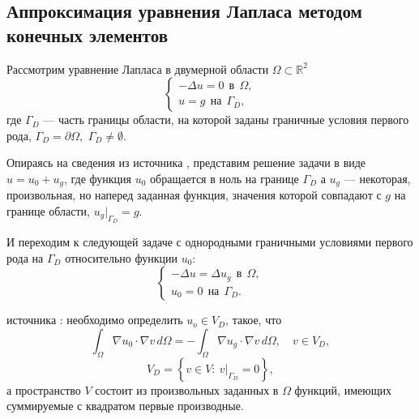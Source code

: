 \documentclass[12pt, a4paper]{article}
\begin{document}
		
		\subsection{Аппроксимация уравнения Лапласа методом конечных элементов}
		
			Рассмотрим уравнение Лапласа в двумерной области $\Omega \subset \mathbb{R}^2$
			\begin{equation*}
				\begin{cases}
					- \Delta u  = 0 \ \  \text{в}\ \  \Omega, \\
					u = g \ \ \text{на}\ \  \Gamma_D,
				\end{cases}			
			\end{equation*}
			где $\Gamma_D$ --- часть границы области, на которой заданы граничные условия первого рода, $\Gamma_D = \partial \Omega,$  $\Gamma_D \ne \emptyset$. 
			
			Опираясь на сведения из источника \cite{Galanin}, представим решение задачи в виде $u = u_0 + u_g$, где функция $u_0$ обращается в ноль на границе $\Gamma_D$ а $u_g$ --- некоторая, произвольная, но наперед заданная функция, значения которой совпадают с $g$ на границе области, $u_g |_{\Gamma_D} = g$.
			
			И переходим к следующей задаче с однородными граничными условиями первого рода на $\Gamma_D$ относительно функции $u_0$:
			\begin{equation*}
			\begin{cases}
				- \Delta u  = \Delta u_g \ \  \text{в}\ \  \Omega, \\
				u_0 = 0 \ \ \text{на}\ \  \Gamma_D.
			\end{cases}			
			\end{equation*}
			
			 источника \cite{Galanin}: необходимо определить $u_o \in V_D$, такое, что 
			\begin{equation*}
				\int_{\Omega} \nabla u_0 \cdot \nabla v \, d\Omega = 
				- \int_{\Omega} \nabla u_g \cdot \nabla v \, d\Omega, \quad v \in V_D,
			\end{equation*}			
			\begin{equation*}
				V_D = \left\{ v \in V: \ v |_{\Gamma_D} = 0 \right\},
			\end{equation*}
			а пространство $V$ состоит из произвольных заданных в $\Omega$ функций, имеющих суммируемые с квадратом первые производные.
			
\end{document}
